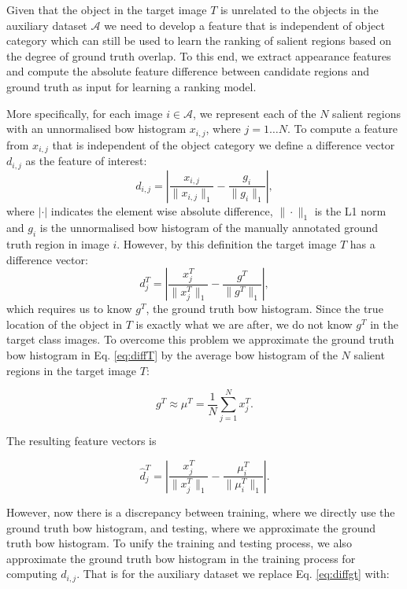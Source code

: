 \documentclass{bmvc2k}
\def\bow{{{\sc b}o{\sc w} }}
\begin{document}
Given that the object in the target image $T$ is unrelated to the objects in the auxiliary dataset $\mathcal{A}$ we need to develop a feature that is independent of object category which can still be used to learn the ranking of salient regions based on the degree of ground truth overlap. To this end, we extract appearance features and compute the absolute feature difference between candidate regions and ground truth as input for learning a ranking model. 

More specifically, for each image $i \in \mathcal{A}$, we represent each of the $N$ salient regions with an unnormalised \bow histogram $x_{i,j}$, where $j=1 \ldots N$. To compute a feature from $x_{i,j}$ that is independent of the object category we define a difference vector $d_{i,j}$ as the feature of interest:
\begin{equation}
d_{i,j} = \left| \frac{x_{i,j}}{\| x_{i,j} \|_1} - \frac{g_{i}}{\| g_{i} \|_1 } \right|,
\label{eq:diffgt}
\end{equation}
where $|\cdot|$ indicates the element wise absolute difference, $\| \cdot \|_1 $ is the L1 norm and $g_{i}$ is the unnormalised \bow histogram of the manually annotated ground truth region in image $i$. However, by this definition the target image $T$ has a difference vector:
\begin{equation}
d^T_{j} = \left| \frac{x^T_{j}}{\| x^T_{j} \|_1} - \frac{g^T}{\| g^T \|_1 } \right|,
\label{eq:diffT}
\end{equation} 
which requires us to know $g^T$, the ground truth \bow histogram. Since the true location of the object in $T$ is exactly what we are after, we do not know $g^T$ in the target class images. To overcome this problem we approximate the ground truth \bow histogram in Eq. \ref{eq:diffT} by the average \bow histogram of the $N$ salient regions in the target image $T$:

\begin{equation}
g^T \approx \mu^T = \frac{1}{N} \sum_{j=1}^N x^T_{j}.
\label{eq:tapp}
\end{equation}

\noindent The resulting feature vectors is

\begin{equation}
\hat{d}^T_{j} = \left| \frac{x^T_{j}}{\| x^T_{j} \|_1} - \frac{\mu^T_{i}}{\| \mu^T_{i} \|_1 } \right|.
\label{eq:diffTapp}
\end{equation}

However, now there is a discrepancy between training, where we directly use the ground truth \bow histogram, and testing, where we approximate the ground truth \bow histogram. To unify the training and testing process, we also approximate the ground truth \bow histogram in the training process for computing $d_{i,j}$. That is for the auxiliary dataset we replace Eq. \ref{eq:diffgt} with: 
\end{document}
